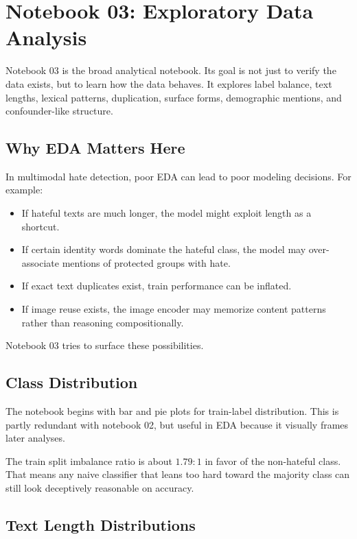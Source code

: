 \documentclass[11pt,a4paper]{report}
\begin{document}
\chapter{Notebook 03: Exploratory Data Analysis}

Notebook 03 is the broad analytical notebook. Its goal is not just to verify the data exists, but to learn how the data behaves. It explores label balance, text lengths, lexical patterns, duplication, surface forms, demographic mentions, and confounder-like structure.

\section{Why EDA Matters Here}

In multimodal hate detection, poor EDA can lead to poor modeling decisions. For example:

\begin{itemize}
\item If hateful texts are much longer, the model might exploit length as a shortcut.
\item If certain identity words dominate the hateful class, the model may over-associate mentions of protected groups with hate.
\item If exact text duplicates exist, train performance can be inflated.
\item If image reuse exists, the image encoder may memorize content patterns rather than reasoning compositionally.
\end{itemize}

Notebook 03 tries to surface these possibilities.

\section{Class Distribution}

The notebook begins with bar and pie plots for train-label distribution. This is partly redundant with notebook 02, but useful in EDA because it visually frames later analyses.

The train split imbalance ratio is about $1.79:1$ in favor of the non-hateful class. That means any naive classifier that leans too hard toward the majority class can still look deceptively reasonable on accuracy.

\section{Text Length Distributions}
\end{document}
